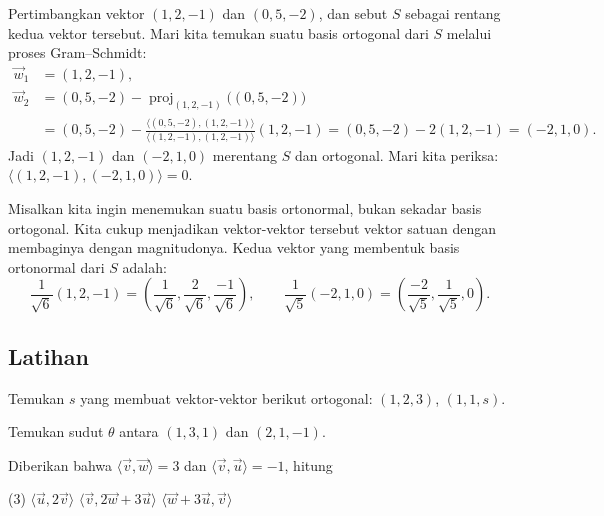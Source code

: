 \begin{example}
Pertimbangkan vektor $(1,2,-1)$ dan $(0,5,-2)$, dan sebut $S$ sebagai rentang
kedua vektor tersebut. Mari kita temukan suatu basis ortogonal dari $S$
melalui proses Gram--Schmidt:
\begin{align*}
\vec{w}_1 & = (1,2,-1) , \\
\vec{w}_2 & = (0,5,-2)
- \operatorname{proj}_{(1,2,-1)}\bigl((0,5,-2)\bigr)
\\
& =
(0,5,-2) -
\frac{\langle (0,5,-2), (1,2,-1) \rangle}{
\langle (1,2,-1), (1,2,-1) \rangle
}
(1,2,-1)
=
(0,5,-2) -
2
(1,2,-1)
=
(-2,1,0) .
\end{align*}
Jadi $(1,2,-1)$ dan $(-2,1,0)$ merentang $S$ dan ortogonal. Mari kita periksa:
$\langle (1,2,-1) , (-2,1,0) \rangle = 0$.

Misalkan kita ingin menemukan suatu basis ortonormal, bukan sekadar basis ortogonal.
Kita cukup menjadikan
vektor-vektor tersebut vektor satuan dengan membaginya dengan magnitudonya. Kedua vektor
yang membentuk basis ortonormal dari $S$ adalah:
\begin{equation*}
\frac{1}{\sqrt{6}} (1,2,-1) = \left(
\frac{1}{\sqrt{6}},
\frac{2}{\sqrt{6}},
\frac{-1}{\sqrt{6}}
\right) ,
\qquad
\frac{1}{\sqrt{5}} (-2,1,0) = \left(
\frac{-2}{\sqrt{5}},
\frac{1}{\sqrt{5}},
0
\right) .
\end{equation*}
\end{example}

\subsection{Latihan}

\begin{exercise}
Temukan $s$ yang membuat vektor-vektor berikut ortogonal:
$(1,2,3)$, $(1,1,s)$.
\end{exercise}

\begin{exercise}
Temukan sudut $\theta$ antara
$(1,3,1)$ dan $(2,1,-1)$.
\end{exercise}

\begin{exercise}
Diberikan bahwa $\langle \vec{v} , \vec{w} \rangle = 3$ dan
$\langle \vec{v} , \vec{u} \rangle = -1$, hitung
\begin{tasks}(3)
\task $\langle \vec{u} , 2 \vec{v} \rangle$
\task $\langle \vec{v} , 2 \vec{w} + 3 \vec{u} \rangle$
\task $\langle \vec{w} + 3 \vec{u}, \vec{v} \rangle$
\end{tasks}
\end{exercise}

